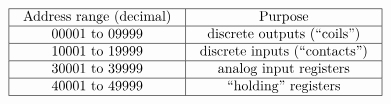 
$$\vbox{\offinterlineskip
\halign{\strut
\vrule \quad\hfil # \ \hfil & 
\vrule \quad\hfil # \ \hfil \vrule \cr
\noalign{\hrule}
%
Address range (decimal) & Purpose \cr
%
\noalign{\hrule}
%
00001 to 09999 & discrete outputs (``coils'') \cr
%
\noalign{\hrule}
%
10001 to 19999 & discrete inputs (``contacts'') \cr
%
\noalign{\hrule}
%
30001 to 39999 & analog input registers \cr
%
\noalign{\hrule}
%
40001 to 49999 & ``holding'' registers \cr
%
\noalign{\hrule}
} %
}$$ %






